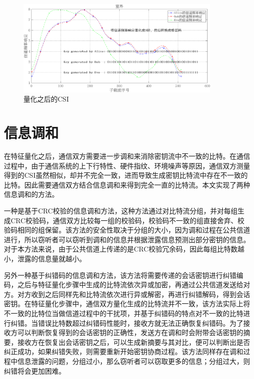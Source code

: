 \documentclass[master]{seuthesis} %
\begin{document}
\begin{Main}
\begin{figure}[htbp!]
    \centering \includegraphics[width=0.9\textwidth]{images/quantization_and_csi} 
    \caption{量化之后的CSI}
    \label{quantization_and_csi}
\end{figure}

\section{信息调和}

在特征量化之后，通信双方需要进一步调和来消除密钥流中不一致的比特。在通信过程中，由于通信系统的上下行特性、硬件指纹、环境噪声等原因，通信双方测量得到的CSI虽然相似，却并不完全一致，进而导致生成密钥比特流中存在不一致的比特。因此需要通信双方结合信息调和来得到完全一直的比特流。本文实现了两种信息调和的方法。

一种是基于CRC校验的信息调和方法，这种方法通过对比特流分组，并对每组生成CRC校验码，通信双方比较每一组的校验码，校验码不一致的组直接舍弃、校验码相同的组保留。该方法的安全性取决于分组的大小，因为调和过程在公共信道进行，所以窃听者可以窃听到调和的信息并根据泄露信息预测出部分密钥的信息。对于本方法来说，由于公共信道上传递的是CRC校验冗余码，因此每组比特数越小，泄露的信息量就越小。

另外一种基于纠错码的信息调和方法，该方法将需要传递的会话密钥进行纠错编码，之后与特征量化步骤中生成的比特流依次异或加密，再通过公共信道发送给对方。对方收到之后同样先和比特流依次进行异或解密，再进行纠错解码，得到会话密钥。在特征量化步骤中，通信双方量化生成的比特流并不一致，该方法实际上将不一致的比特位当做信道过程中的干扰项，并基于纠错码的特点对不一致的比特进行纠错。当错误比特数超过纠错码性能时，接收方就无法正确恢复纠错码。为了接收方可以判断恢复得到的会话密钥的正确性，发送方在调和时会附带会话密钥的摘要，接收方在恢复出会话密钥之后，可以生成新摘要与其对比，便可以判断出是否纠正成功，如果纠错失败，则需要重新开始密钥协商过程。该方法同样存在调和过程中信息泄露的问题，分组过小，那么窃听者可以窃取更多的信息；分组过大，则纠错将会更加困难\cite{李古月2014无线信道的密钥生成方法}。


\end{Main}
\end{document}
